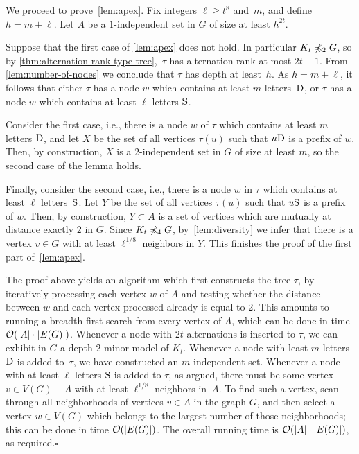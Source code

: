 We proceed to prove~\cref{lem:apex}. 
Fix integers $\ell\ge t^8$ and~$m$, and define $h=m+\ell$.
Let $A$ be a $1$-independent set in $G$
of size at least $h^{2t}$.

Suppose that the first case of \cref{lem:apex} does not hold. In particular $K_t\not\preccurlyeq_2 G$, so by \cref{thm:alternation-rank-type-tree},~$\tau$ has alternation rank at most $2t-1$. From \cref{lem:number-of-nodes} 
we conclude that $\tau$  has depth at least~$h$.
As $h=m+\ell$, it follows that either $\tau$  has a node $w$ which contains at least $m$ letters~$\mathrm{D}$, or $\tau$ has a node $w$ which contains  at least $\ell$ letters $\mathrm{S}$.

Consider the first case, i.e., there is a node $w$ of $\tau$
which contains at least $m$ letters $\mathrm{D}$, and let $X$
be the set of all vertices $\tau(u)$ such that $u\mathrm{D}$ is a prefix of $w$. Then, by construction, $X$ is a $2$-independent set in $G$ of size at least $m$, so the second case of the lemma holds.

Finally, consider the second case, i.e., there is a node $w$ in $\tau$ which contains at least $\ell$ letters~$\mathrm{S}$. Let 
$Y$ be the set of all vertices $\tau(u)$ such that $u\mathrm{S}$ is a prefix of $w$. Then, by construction, $Y\subset A$ is a set of vertices which are mutually at distance exactly $2$ in $G$. 
Since $K_t\not\preccurlyeq_4 G$, by~\cref{lem:diversity} we infer that there is a vertex $v\in G$
with at least $\ell^{1/8}$ neighbors in $Y$.
This finishes the proof of the first part of~\cref{lem:apex}.

The proof above yields an algorithm which first constructs the tree $\tau$, by 
iteratively processing each vertex $w$ of $A$ and testing whether the distance between $w$ and each vertex processed already is equal to $2$.
This amounts to running a breadth-first search from every vertex of $A$, which can be done in time $\mathcal{O}(|A|\cdot |E(G)|)$.
Whenever a node with $2t$ alternations 
is inserted to $\tau$, we can exhibit in $G$ a depth-$2$ minor model of $K_t$.
Whenever a node with least $m$ letters $\mathrm{D}$ is added to~$\tau$,
we have constructed an $m$-independent set. Whenever a node with at least $\ell$ letters $\mathrm{S}$ is added to $\tau$, as argued, there must be some vertex $v\in V(G)-A$ with at least $\ell^{1/8}$ neighbors in~$A$. 
To find such a vertex, scan through all neighborhoods of vertices $v\in A$ in the graph $G$, and then select a vertex $w\in V(G)$
which belongs to the largest number of those neighborhoods; this can be done in time $\mathcal{O}(|E(G)|)$.
The overall running time is $\mathcal{O}(|A|\cdot |E(G)|)$, as required.\hfill$\square$

